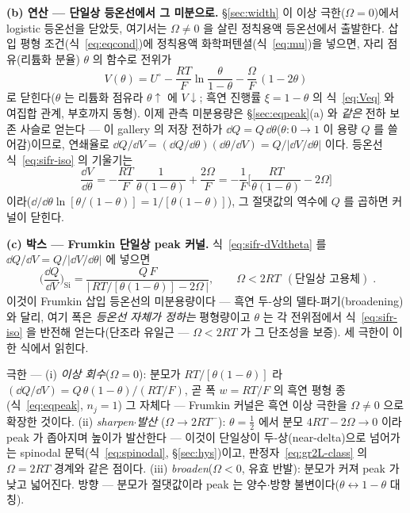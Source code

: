 \textbf{(b) 연산 --- 단일상 등온선에서 그 미분으로.} \S\ref{sec:width} 이 이상 극한($\Omega{=}0$)에서 logistic
등온선을 닫았듯, 여기서는 $\Omega\neq0$ 을 살린 정칙용액 등온선에서 출발한다. 삽입 평형 조건(식~\eqref{eq:eqcond})에
정칙용액 화학퍼텐셜(식~\eqref{eq:mu})을 넣으면, 자리 점유(리튬화 분율) $\theta$ 의 함수로 전위가
\begin{equation}
V(\theta)=U^{\circ}-\frac{RT}{F}\ln\frac{\theta}{1-\theta}-\frac{\Omega}{F}\,(1-2\theta)
\label{eq:sifr-iso}
\end{equation}
로 닫힌다($\theta$ 는 리튬화 점유라 $\theta\!\uparrow$ 에 $V\!\downarrow$; 흑연 진행률 $\xi{=}1-\theta$ 의
식~\eqref{eq:Veq} 와 여집합 관계, 부호까지 동형). 이제 관측 미분용량은 \S\ref{sec:eqpeak}(a) 와 \emph{같은}
전하 보존 사슬로 얻는다 --- 이 gallery 의 저장 전하가 $\dd Q=Q\,\dd\theta$($\theta:0\!\to\!1$ 이 용량 $Q$ 를
쓸어감)이므로, 연쇄율로 $\dd Q/\dd V=(\dd Q/\dd\theta)(\dd\theta/\dd V)=Q/|\dd V/\dd\theta|$ 이다. 등온선
식~\eqref{eq:sifr-iso} 의 기울기는
\begin{equation}
\frac{\dd V}{\dd\theta}=-\frac{RT}{F}\,\frac{1}{\theta(1-\theta)}+\frac{2\Omega}{F}
=-\frac1F\Big[\frac{RT}{\theta(1-\theta)}-2\Omega\Big]
\label{eq:sifr-dVdtheta}
\end{equation}
이라($\dd/\dd\theta\ln[\theta/(1-\theta)]=1/[\theta(1-\theta)]$), 그 절댓값의 역수에 $Q$ 를 곱하면 커널이 닫힌다.

\textbf{(c) 박스 --- Frumkin 단일상 peak 커널.} 식~\eqref{eq:sifr-dVdtheta} 를 $\dd Q/\dd V=Q/|\dd V/\dd\theta|$
에 넣으면
\begin{equation}
\boxed{\;
\Big(\frac{\dd Q}{\dd V}\Big)_{\!\mathrm{Si}}
=\frac{Q\,F}{\big|\,RT/[\theta(1-\theta)]-2\Omega\,\big|},
\qquad \Omega<2RT\ \ (\text{단일상 고용체})\;.}
\label{eq:sifr-kernel}
\end{equation}
이것이 Frumkin 삽입 등온선의 미분용량이다\cite{leviaurbach1999} --- 흑연 두-상의 델타-펴기(broadening)와
달리, 여기 폭은 \emph{등온선 자체가 정하는} 평형량이고 $\theta$ 는 각 전위점에서 식~\eqref{eq:sifr-iso} 을
반전해 얻는다(단조라 유일근 --- $\Omega<2RT$ 가 그 단조성을 보증). 세 극한이 이 한 식에서 읽힌다.
\begin{signbox}
극한 --- (i) \emph{이상 회수}($\Omega{=}0$): 분모가 $RT/[\theta(1-\theta)]$ 라
$(\dd Q/\dd V)=Q\,\theta(1-\theta)/(RT/F)$, 곧 폭 $w{=}RT/F$ 의 흑연 평형 종(식~\eqref{eq:eqpeak}, $n_j{=}1$)
그 자체다 --- Frumkin 커널은 흑연 이상 극한을 $\Omega{\neq}0$ 으로 확장한 것이다. (ii) \emph{sharpen$\cdot$발산}
($\Omega\!\to\!2RT^{-}$): $\theta{=}\tfrac12$ 에서 분모 $4RT-2\Omega\!\to\!0$ 이라 peak 가 좁아지며 높이가
발산한다 --- 이것이 단일상이 두-상(near-delta)으로 넘어가는 spinodal 문턱(식~\eqref{eq:spinodal},
\S\ref{sec:hys})이고, 판정자~\eqref{eq:gr2L-class} 의 $\Omega{=}2RT$ 경계와 같은 점이다. (iii)
\emph{broaden}($\Omega<0$, 유효 반발): 분모가 커져 peak 가 낮고 넓어진다. 방향 --- 분모가 절댓값이라 peak 는
양수$\cdot$방향 불변이다($\theta\!\leftrightarrow\!1-\theta$ 대칭).
\end{signbox}


